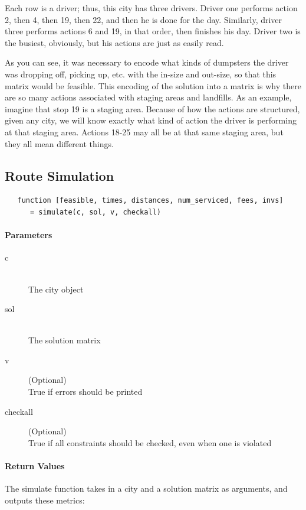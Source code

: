 \documentclass{article}
\begin{document}
\vspace{5mm}


Each row is a driver; thus, this city has three drivers.
Driver one performs action 2, then 4, then 19, then 22, and then he is done for the day.
Similarly, driver three performs actions 6 and 19, in that order, then finishes his day.  
Driver two is the busiest, obviously, but his actions are just as easily read.

As you can see, it was necessary to encode what kinds of dumpsters the driver was dropping off, picking up, etc. with the in-size and out-size, so that this matrix would be feasible. 
This encoding of the solution into a matrix is why there are so many actions associated with staging areas and landfills.
As an example, imagine that stop 19 is a staging area. 
Because of how the actions are structured, given any city, we will know exactly what kind of action the driver is performing at that staging area. 
Actions 18-25 may all be at that same staging area, but they all mean different things.


\subsection{Route Simulation}
\begin{verbatim}
   function [feasible, times, distances, num_serviced, fees, invs] 
      = simulate(c, sol, v, checkall)
\end{verbatim}

\paragraph{Parameters}
\begin{description}
\item[c] \hfill \\ The city object
\item[sol] \hfill \\ The solution matrix
\item[v] (Optional)\hfill \\   True if errors should be printed
\item[checkall] (Optional)\hfill \\  True if all constraints should be checked, even when one is violated
\end{description}

\paragraph{Return Values}
The simulate function takes in a city and a solution matrix as arguments, and outputs these metrics:
\end{document}

